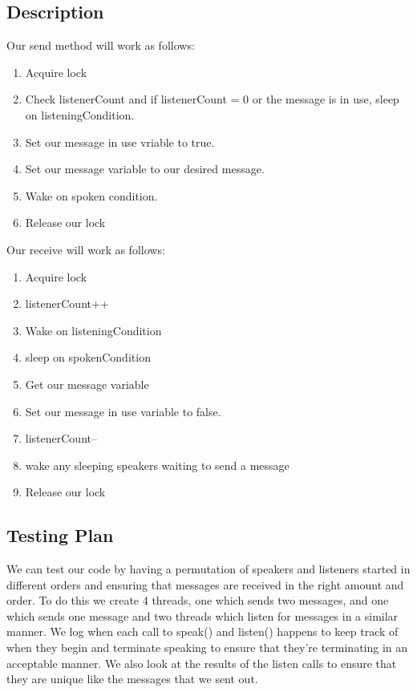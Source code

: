 \documentclass{article}
\begin{document}
\subsection*{Description}
Our send method will work as follows:
\begin{enumerate}
\item Acquire lock
\item Check listenerCount and if listenerCount = 0 or the message is in use, sleep on listeningCondition.  
\item Set our message in use vriable to true.
\item Set our message variable to our desired message. 
\item Wake on spoken condition.
\item Release our lock
\end{enumerate}

Our receive will work as follows:
\begin{enumerate}
\item Acquire lock 
\item listenerCount++ 
\item Wake on listeningCondition 
\item sleep on spokenCondition 
\item Get our message variable
\item Set our message in use variable to false.
\item listenerCount-- 
\item wake any sleeping speakers waiting to send a message
\item Release our lock 
\end{enumerate}

\subsection*{Testing Plan}

We can test our code by having a permutation of speakers and listeners started in different orders and ensuring that
messages are received in the right amount and order. To do this we create 4 threads, one which sends two messages, and
one which sends one message and two threads which listen for messages in a similar manner. We log when each call to
speak() and listen() happens to keep track of when they begin and terminate speaking to ensure that they're terminating
in an acceptable manner. We also look at the results of the listen calls to ensure that they are unique like the
messages that we sent out.
\end{document}
